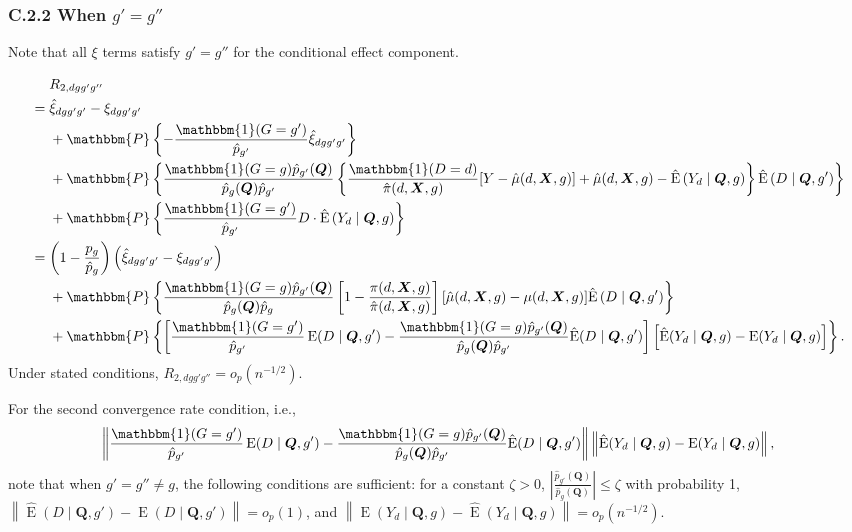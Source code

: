 \documentclass[12pt,a4paper]{article}
\newcommand{\E}{\operatorname{E}}
\def\X{{\boldsymbol X}}
\def\Q{{\boldsymbol Q}}
\def\one{\mathbbm{1}}
\def\P{\mathbbm{P}}
\begin{document}
\subsubsection*{C.2.2 When $g'=g''$}
Note that all $\xi$ terms satisfy $g'=g''$ for the conditional effect component.

\begin{align*}
    &\phantom{{}={}} R_{2,dgg'g''} \\
    &= \hat{\xi}_{dgg'g'} - \xi_{dgg'g'} \\
    &\phantom{{}={}} + \P \left\{- \frac{\one(G=g')}{\hat{p}_{g'}} \hat{\xi}_{dgg'g'} \right\} \\
    &\phantom{{}={}} + \P \left\{ \frac{\one(G=g) \hat{p}_{g'}(\Q)}{\hat{p}_g(\Q)\hat{p}_{g'}} \left\{ \frac{\one(D=d)}{\hat{\pi}(d,\X,g)} [Y-\hat{\mu}(d,\X,g)]+\hat{\mu}(d,\X,g) - \hat{\E} \left(Y_d \mid \Q,g \right) \right\} \hat{\E} \left(D \mid \Q,g' \right) \right\} \\
    &\phantom{{}={}} + \P \left\{ \frac{\one(G=g')}{\hat{p}_{g'}} D \cdot \hat{\E}\left( Y_d \mid \Q, g \right) \right\} \\
    &= \left(1-\frac{p_g}{\hat{p}_g}\right)\left(\hat{\xi}_{dgg'g'} - \xi_{dgg'g'} \right) \\
    &\phantom{{}={}} + \P\left\{ \frac{\one(G=g) \hat{p}_{g'}(\Q) }{\hat{p}_g(\Q) \hat{p}_{g} } \left[ 1-\frac{\pi(d,\X,g)}{\hat{\pi}(d,\X,g)} \right]  [\hat{\mu}(d,\X,g)-\mu(d,\X,g)]  \hat{\E} \left(D \mid \Q,g' \right) \right\} \\
    &\phantom{{}={}} + \P\left\{ \left[ \frac{\one(G=g') }{\hat{p}_{g'}}\E(D \mid \Q,g') - \frac{\one(G=g) \hat{p}_{g'}(\Q) }{\hat{p}_g(\Q) \hat{p}_{g'} } \hat{\E}(D \mid \Q,g') \right] \left[ \hat{\E}(Y_d \mid \Q,g) - \E(Y_d \mid \Q,g) \right] \right\}.
\end{align*}
Under stated conditions, $R_{2,dgg'g''}=o_p(n^{-1/2})$. 

For the second convergence rate condition, i.e., 
$$\left\| \frac{\one(G=g') }{\hat{p}_{g'}}\E(D \mid \Q,g') - \frac{\one(G=g) \hat{p}_{g'}(\Q) }{\hat{p}_g(\Q) \hat{p}_{g'} } \hat{\E}(D \mid \Q,g') \right\| \left\| \hat{\E}(Y_d \mid \Q,g) - \E(Y_d \mid \Q,g) \right\|,$$
note that when $g'=g'' \neq g$, the following conditions are sufficient: for a constant $\zeta>0$, $\left| \frac{\hat{p}_{g'}(\Q)}{\hat{p}_{g}(\Q)}\right| \leq \zeta$ with probability 1, $\left\| \hat{\E}(D \mid \Q, g') - \E(D \mid \Q, g') \right\|=o_p(1)$, and $\left\| \E(Y_d \mid \Q,g) - \hat{\E}\left( Y_d \mid \Q, g \right) \right\|=o_p(n^{-1/2})$. 
\end{document}
